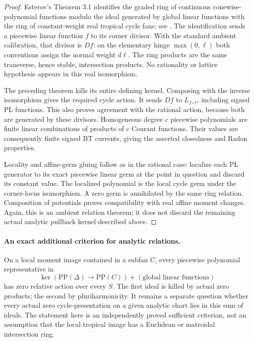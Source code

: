 \documentclass[11pt,a4paper]{article}
\numberwithin{equation}{section}
\theoremstyle{definition}
\theoremstyle{remark}
\begin{document}
\begin{proof}
Esterov's Theorem 3.1 identifies the graded ring of
continuous conewise-polynomial functions modulo the
ideal generated by global linear functions with the
ring of constant-weight real tropical cycle fans;
see \cite[Section 3, printed p.~12]{Est12}.
The identification sends a piecewise linear function
$f$ to its corner divisor. With the standard ambient
calibration, that divisor is $Df$: on the elementary
hinge $\max(0,\ell)$ both conventions assign the
normal weight $d\ell$. The ring products are the same
transverse, hence stable, intersection products. No
rationality or lattice hypothesis appears in this
real isomorphism.

The preceding theorem kills its entire defining
kernel. Composing with the inverse isomorphism gives
the required cycle action. It sends $Df$ to
$L_{f\circ t}$, including signed PL functions. This
also proves agreement with the rational action,
because both are generated by these divisors.
Homogeneous degree $c$ piecewise polynomials are finite
linear combinations of products of $c$ Courant
functions. Their values are consequently finite signed
BT currents, giving the asserted closedness and Radon
properties.

Locality and affine-germ gluing follow as in the
rational case: localize each PL generator to its exact
piecewise linear germ at the point in question and
discard its constant value. The localized polynomial
is the local cycle germ under the corner-locus
isomorphism. A zero germ is annihilated by the same
ring relation. Composition of potentials proves
compatibility with real affine moment changes.
Again, this is an ambient relation theorem; it does
not discard the remaining actual analytic pullback
kernel described above.
\end{proof}

\paragraph{An exact additional criterion for analytic relations.}
On a local moment image contained in a subfan $C$, every
piecewise polynomial representative in
\[
 \ker(\mathrm{PP}(\Delta)\to\mathrm{PP}(C))
        + (\text{global linear functions})
\]
has zero relative action over every $S$. The first ideal
is killed by actual zero products; the second by
pluriharmonicity. It remains a separate question whether
every actual zero cycle-presentation on a given analytic
chart lies in this sum of ideals. The statement here is
an independently proved sufficient criterion, not an
assumption that the local tropical image has a Euclidean
or matroidal intersection ring.
\end{document}
